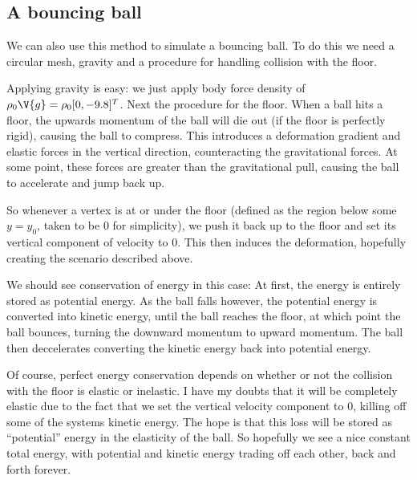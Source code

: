 \documentclass[sigconf]{acmart}
\begin{document}
\subsection{A bouncing ball}
We can also use this method to simulate a bouncing ball. To do this we need a circular mesh, gravity and a procedure for handling collision with the floor.

Applying gravity is easy: we just apply body force density of $ \rho_0\V{g}=\rho_0[0, -9.8]^T $. Next the procedure for the floor. When a ball hits a floor, the upwards momentum of the ball will die out (if the floor is perfectly rigid), causing the ball to compress. This introduces a deformation gradient and elastic forces in the vertical direction, counteracting the gravitational forces. At some point, these forces are greater than the gravitational pull, causing the ball to accelerate and jump back up.

So whenever a vertex is at or under the floor (defined as the region below some $ y=y_0 $, taken to be $ 0 $ for simplicity), we push it back up to the floor and set its vertical component of velocity to 0. This then induces the deformation, hopefully creating the scenario described above.

We should see conservation of energy in this case: At first, the energy is entirely stored as potential energy. As the ball falls however, the potential energy is converted into kinetic energy, until the ball reaches the floor, at which point the ball bounces, turning the downward momentum to upward momentum. The ball then deccelerates converting the kinetic energy back into potential energy.

Of course, perfect energy conservation depends on whether or not the collision with the floor is elastic or inelastic. I have my doubts that it will be completely elastic due to the fact that we set the vertical velocity component to 0, killing off some of the systems kinetic energy. The hope is that this loss will be stored as ``potential'' energy in the elasticity of the ball. So hopefully we see a nice constant total energy, with potential and kinetic energy trading off each other, back and forth forever.
\end{document}
